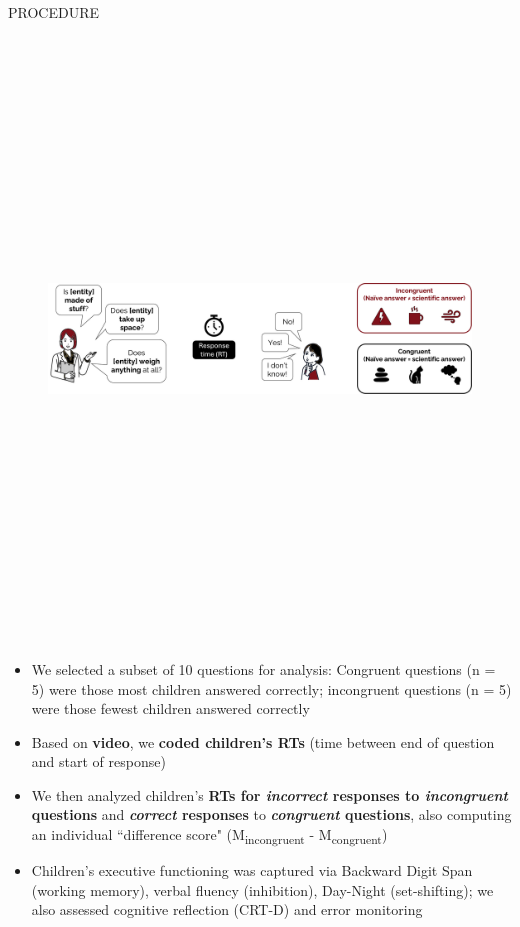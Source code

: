 \documentclass[final]{beamer}
\newlength{\colwidth}
\begin{document}
\begin{frame}[t]
\begin{columns}[t]
\begin{column}{\colwidth}
\begin{block}{PROCEDURE}
    \begin{figure}
      \centering
	{\includegraphics[height=16cm]{images/procedure7.png}}\\[2ex]
    \end{figure}

    \begin{itemize}
    	\item We selected a subset of 10 questions for analysis: Congruent questions (n = 5) were those most children answered correctly; incongruent questions (n = 5) were those fewest children answered correctly
	\item Based on \textbf{video}, we \textbf{coded children's RTs} (time between end of question and start of response)
	\item We then analyzed children's \textbf{RTs for \emph{incorrect} responses to \emph{incongruent} questions} and \textbf{\emph{correct} responses} to \textbf{\emph{congruent} questions}, also computing an individual “difference score" (M\textsubscript{incongruent} - M\textsubscript{congruent})
	\item Children's executive functioning was captured via Backward Digit Span (working memory), verbal fluency (inhibition), Day-Night (set-shifting); we also assessed cognitive reflection (CRT-D) and error monitoring
    \end{itemize}
    

\end{block}
\end{column}
\end{columns}
\end{frame}
\end{document}
